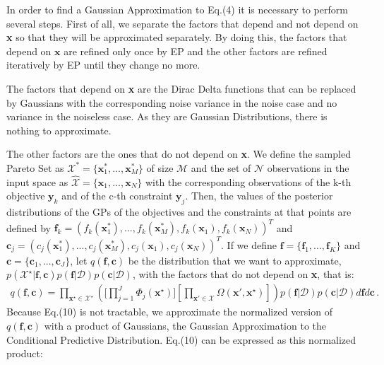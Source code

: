 \documentclass[review,preprint,12pt]{elsarticle}
\begin{document}
In order to find a Gaussian Approximation to Eq.(4) it is necessary to perform several steps. First of all, we separate the factors that depend and not depend on \textbf{x} so that they will be approximated separately. By doing this, the factors that depend on $\boldsymbol{x}$ are refined only once by EP and the other factors are refined iteratively by EP until they change no more. 

The factors that depend on \textbf{x} are the Dirac Delta functions that can be replaced by Gaussians with the corresponding noise variance in the noise case and no variance in the noiseless case. As they are Gaussian Distributions, there is nothing to approximate.

The other factors are the ones that do not depend on \textbf{x}. We define the sampled Pareto Set as $\mathcal{X}^{*} = \{\boldsymbol{x}^{*}_{1},...,\boldsymbol{x}^{*}_{M}\}$ of size $\mathcal{M}$ and the set of $\mathcal{N}$ observations in the input space as $\hat{\mathcal{X}} = \{\boldsymbol{x}_1,...,\boldsymbol{x}_N\}$ with the corresponding observations of the k-th objective $\boldsymbol{y}_k$ and of the c-th constraint $\boldsymbol{y}_j$. Then, the values of the posterior distributions of the GPs of the objectives and the constraints at that points are defined by $\boldsymbol{f}_k = ( f_k(\boldsymbol{x}^{*}_1), ... , f_k(\boldsymbol{x}^{*}_M), f_k(\boldsymbol{x}_1),  f_k(\boldsymbol{x}_N))^T$ and $\boldsymbol{c}_j = ( c_j(\boldsymbol{x}^{*}_1), ... , c_j(\boldsymbol{x}^{*}_M), c_j(\boldsymbol{x}_1), c_j(\boldsymbol{x}_N))^T$. If we define $\boldsymbol{f} = \{\boldsymbol{f}_1,...,\boldsymbol{f}_K\}$ and $\boldsymbol{c} = \{\boldsymbol{c}_1,...,\boldsymbol{c}_J\}$, let $q(\boldsymbol{f},\boldsymbol{c})$ be the distribution that we want to approximate, $p(\mathcal{X}^{\star}|\textbf{f},\textbf{c}) p(\textbf{f}|\mathcal{D}) p(\textbf{c}|\mathcal{D})$, with the factors that do not depend on \textbf{x}, that is:
\begin{align}
q(\boldsymbol{f},\boldsymbol{c}) = \prod_{\textbf{x}^\star\in \mathcal{X}^\star} 
	\left(
	\Bigg[\prod_{j=1}^{J}\Phi_j(\textbf{x}^{\star})\Bigg]
	\left[ 
	\prod_{\textbf{x}'\in \mathcal{X}} 
	\Omega(\textbf{x}',\textbf{x}^{\star})
	\right]	
	\right)
p(\textbf{f}|\mathcal{D}) p(\textbf{c}|\mathcal{D})
 d\textbf{f} d\textbf{c}\,.
\end{align}
Because Eq.(10) is not tractable, we approximate the normalized version of $q(\boldsymbol{f},\boldsymbol{c})$ with a product of Gaussians, the Gaussian Approximation to the Conditional Predictive Distribution. Eq.(10) can be expressed as this normalized product: 
\end{document}
